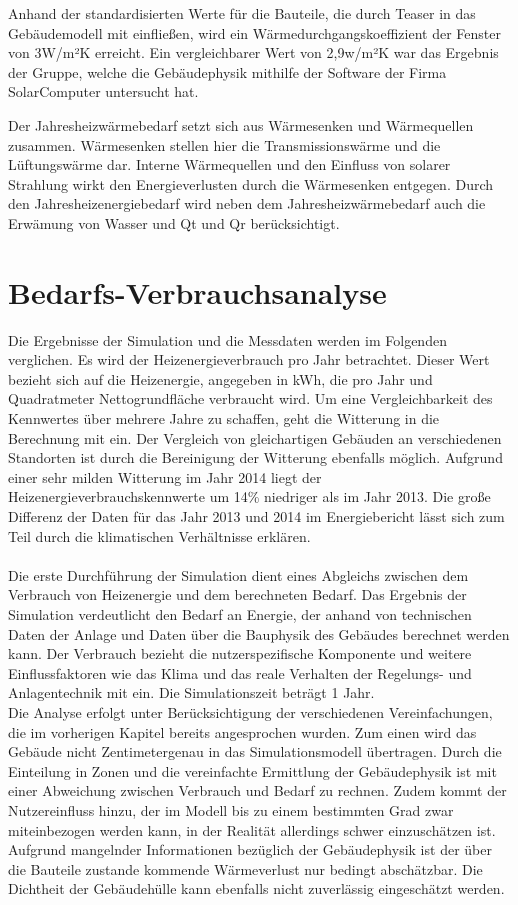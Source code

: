 Anhand der standardisierten Werte für die Bauteile, die durch Teaser in das Gebäudemodell mit einfließen, wird ein Wärmedurchgangskoeffizient der Fenster von 3W/m²K erreicht. Ein vergleichbarer Wert von 2,9w/m²K war das Ergebnis der Gruppe, welche die Gebäudephysik mithilfe der Software der Firma SolarComputer untersucht hat. 

Der Jahresheizwärmebedarf setzt sich aus Wärmesenken und Wärmequellen zusammen. Wärmesenken stellen hier die Transmissionswärme und die Lüftungswärme dar. Interne Wärmequellen und den Einfluss von solarer Strahlung wirkt den Energieverlusten durch die Wärmesenken entgegen. 
Durch den Jahresheizenergiebedarf wird neben dem Jahresheizwärmebedarf auch die Erwämung von Wasser und Qt und Qr berücksichtigt.
\section{Bedarfs-Verbrauchsanalyse}
\label{sec:Bedarfs-Verbrauchsanalyse}
Die Ergebnisse der Simulation und die Messdaten werden im Folgenden verglichen. Es wird der Heizenergieverbrauch pro Jahr betrachtet. Dieser Wert bezieht sich auf die Heizenergie, angegeben in kWh, die pro Jahr und Quadratmeter Nettogrundfläche verbraucht wird. Um eine Vergleichbarkeit des Kennwertes über mehrere Jahre zu schaffen, geht die Witterung in die Berechnung mit ein. Der Vergleich von gleichartigen Gebäuden an verschiedenen Standorten ist durch die Bereinigung der Witterung ebenfalls möglich. Aufgrund einer sehr milden Witterung im Jahr 2014 liegt der Heizenergieverbrauchskennwerte um 14\% niedriger als im Jahr 2013. Die große Differenz der Daten für das Jahr 2013 und 2014 im Energiebericht lässt sich zum Teil durch die klimatischen Verhältnisse erklären. \\
\\
Die erste Durchführung der Simulation dient eines Abgleichs zwischen dem Verbrauch von Heizenergie und dem berechneten Bedarf. Das Ergebnis der Simulation verdeutlicht den Bedarf an Energie, der anhand von technischen Daten der Anlage und Daten über die Bauphysik des Gebäudes berechnet werden kann. Der Verbrauch bezieht die nutzerspezifische Komponente und weitere Einflussfaktoren wie das Klima und das reale Verhalten der Regelungs- und Anlagentechnik mit ein. Die Simulationszeit beträgt 1 Jahr. \\
Die Analyse erfolgt unter Berücksichtigung der verschiedenen Vereinfachungen, die im vorherigen Kapitel bereits angesprochen wurden. Zum einen wird das Gebäude nicht Zentimetergenau in das Simulationsmodell übertragen. Durch die Einteilung in Zonen und die vereinfachte Ermittlung der Gebäudephysik ist mit einer Abweichung zwischen Verbrauch und Bedarf zu rechnen. Zudem kommt der Nutzereinfluss hinzu, der im Modell bis zu einem bestimmten Grad zwar miteinbezogen werden kann, in der Realität allerdings schwer einzuschätzen ist.
Aufgrund mangelnder Informationen bezüglich der Gebäudephysik ist der über die Bauteile zustande kommende Wärmeverlust nur bedingt abschätzbar. Die Dichtheit der Gebäudehülle kann ebenfalls nicht zuverlässig eingeschätzt werden.\\

